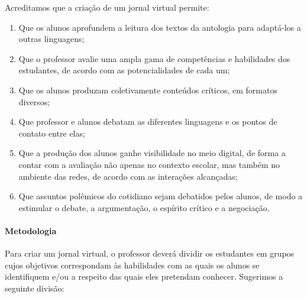 \documentclass{extarticle}
\begin{document}
Acreditamos que a criação de um jornal virtual permite: 

\begin{enumerate}
\item Que os alunos
aprofundem a leitura dos textos da antologia para adaptá-los a outras
linguagens; 

\item Que o professor avalie uma ampla gama de competências e
habilidades dos estudantes, de acordo com as potencialidades de cada um;


\item Que os alunos produzam coletivamente conteúdos críticos, em formatos
diversos; 

\item Que professor e alunos debatam as diferentes linguagens e
os pontos de contato entre elas; 

\item Que a produção dos alunos ganhe
visibilidade no meio digital, de forma a contar com a avaliação não
apenas no contexto escolar, mas também no ambiente das redes, de acordo
com as interações alcançadas; 

\item Que assuntos polêmicos do cotidiano
sejam debatidos pelos alunos, de modo a estimular o debate, a
argumentação, o espírito crítico e a negociação.
\end{enumerate}

\paragraph{Metodologia}

Para criar um jornal virtual, o professor deverá dividir os estudantes
em grupos cujos objetivos correspondam às habilidades com as quais os
alunos se identifiquem e/ou a respeito das quais eles pretendam
conhecer. Sugerimos a seguinte divisão:
\end{document}
